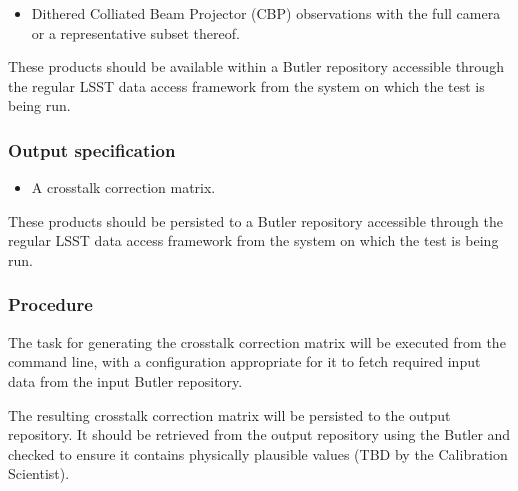 \begin{itemize}

  \item{Dithered Colliated Beam Projector (CBP) observations with the full
  camera or a representative subset thereof.}

\end{itemize}

These products should be available within a Butler repository accessible
through the regular LSST data access framework from the system on which the test
is being run.

\subsubsection{Output specification}

\begin{itemize}

  \item{A crosstalk correction matrix.}

\end{itemize}

These products should be persisted to a Butler repository accessible through
the regular LSST data access framework from the system on which the test is
being run.

\subsubsection{Procedure}

The task for generating the crosstalk correction matrix will be executed from the
command line, with a configuration appropriate for it to fetch required input
data from the input Butler repository.

The resulting crosstalk correction matrix will be persisted to the output
repository. It should be retrieved from the output repository using the Butler
and checked to ensure it contains physically plausible values (TBD by the
Calibration Scientist).
